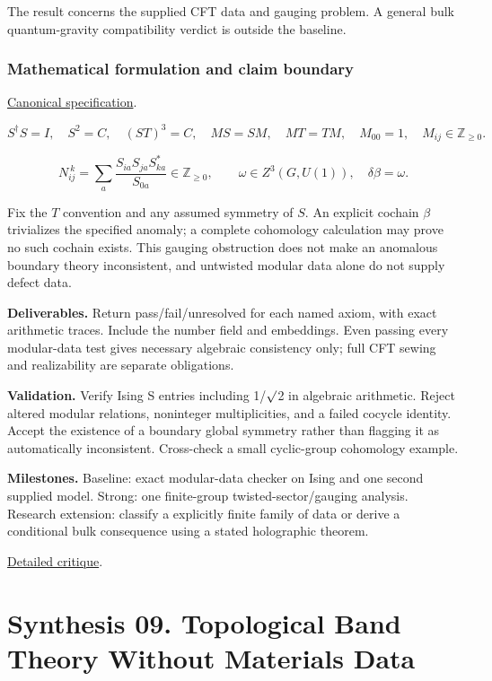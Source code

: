 \documentclass[
  11pt,
]{article}
\begin{document}
The result concerns the supplied CFT data and gauging problem. A general
bulk quantum-gravity compatibility verdict is outside the baseline.

\subsubsection{Mathematical formulation and claim boundary}

\href{https://github.com/rick-stevens-ai/Pure-Thought/blob/main/PRDs/08-Swampland-Modularity-Symmetries.md}{Canonical
specification}.

\[S^\dagger S=I,\quad S^2=C,\quad(ST)^3=C,\quad
MS=SM,\quad MT=TM,\quad M_{00}=1,\quad M_{ij}\in\mathbb Z_{\ge0}.\]

\[N_{ij}^{\ k}=\sum_a\frac{S_{ia}S_{ja}S_{ka}^*}{S_{0a}}
\in\mathbb Z_{\ge0},\qquad \omega\in Z^3(G,U(1)),\quad\delta\beta=\omega.\]

Fix the \(T\) convention and any assumed symmetry of \(S\). An explicit
cochain \(\beta\) trivializes the specified anomaly; a complete
cohomology calculation may prove no such cochain exists. This gauging
obstruction does not make an anomalous boundary theory inconsistent, and
untwisted modular data alone do not supply defect data.

\textbf{Deliverables.} Return pass/fail/unresolved for each named axiom,
with exact arithmetic traces. Include the number field and embeddings.
Even passing every modular-data test gives necessary algebraic
consistency only; full CFT sewing and realizability are separate
obligations.

\textbf{Validation.} Verify Ising S entries including
1/\ensuremath{\surd}2 in algebraic arithmetic. Reject altered modular
relations, noninteger multiplicities, and a failed cocycle identity.
Accept the existence of a boundary global symmetry rather than flagging
it as automatically inconsistent. Cross-check a small cyclic-group
cohomology example.

\textbf{Milestones.} Baseline: exact modular-data checker on Ising and
one second supplied model. Strong: one finite-group
twisted-sector/gauging analysis. Research extension: classify a
explicitly finite family of data or derive a conditional bulk
consequence using a stated holographic theorem.

\href{https://github.com/rick-stevens-ai/Pure-Thought/blob/main/reviews/08-Swampland-Modularity-Symmetries.md}{Detailed
critique}.

\section{Synthesis 09. Topological Band Theory Without Materials Data}
\end{document}
